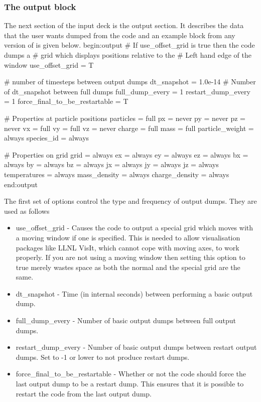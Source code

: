 \documentclass[12pt,a4paper]{article}
\newcommand{\EPOCH}{{\color{warwickdark}\fontfamily{phv}\selectfont{EPOCH}}}
\newenvironment{boxverbatim}{\lboxverbatim{none}}{\endlboxverbatim}
\begin{document}
\subsubsection{The output block}
The next section of the input deck is the output section. It describes the
data that the user wants dumped from the code and an example block from any
version of {\EPOCH} is given below.
\begin{boxverbatim}
begin:output
   # If use_offset_grid is true then the code dumps a
   # grid which displays positions relative to the
   # Left hand edge of the window
   use_offset_grid = T

   # number of timesteps between output dumps
   dt_snapshot = 1.0e-14
   # Number of dt_snapshot between full dumps
   full_dump_every = 1
   restart_dump_every = 1
   force_final_to_be_restartable = T

   # Properties at particle positions
   particles = full
   px = never
   py = never
   pz = never
   vx = full
   vy = full
   vz = never
   charge = full
   mass = full
   particle_weight = always
   species_id = always

   # Properties on grid
   grid = always
   ex = always
   ey = always
   ez = always
   bx = always
   by = always
   bz = always
   jx = always
   jy = always
   jz = always
   temperatures = always
   mass_density = always
   charge_density = always
end:output
\end{boxverbatim}

The first set of options control the type and frequency of output dumps. They
are used as follows\\
\begin{itemize}
\item use\_offset\_grid - Causes the code to output a special grid which moves
  with a moving window if one is specified. This is needed to allow
  visualisation packages like LLNL VisIt, which cannot cope with moving axes, to
  work properly. If you are not using a moving window then setting this option
  to true merely wastes space as both the normal and the special grid are the
  same.
\item dt\_snapshot - Time (in internal seconds) between performing a basic
  output dump.
\item full\_dump\_every - Number of basic output dumps between full output
  dumps.
\item restart\_dump\_every - Number of basic output dumps between restart
  output dumps. Set to -1 or lower to not produce restart dumps.
\item force\_final\_to\_be\_restartable - Whether or not the code should force
  the last output dump to be a restart dump. This ensures that it is possible
  to restart the code from the last output dump.
\end{itemize}
\end{document}
